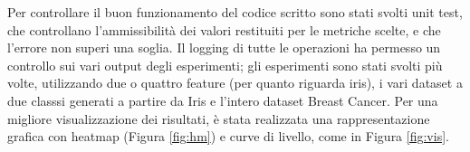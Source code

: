 \documentclass[oneside, openany]{book}
\begin{document}
	Per controllare il buon funzionamento del codice scritto sono stati svolti unit test, che controllano l'ammissibilità dei valori restituiti per le metriche scelte, e che l'errore non superi una soglia. Il logging di tutte le operazioni ha permesso un controllo sui vari output degli esperimenti; gli esperimenti sono stati svolti più volte, utilizzando due o quattro feature (per quanto riguarda iris), i vari dataset a due classsi generati a partire da Iris e l'intero dataset Breast Cancer.
	Per una migliore visualizzazione dei risultati, è stata realizzata una rappresentazione grafica con heatmap (Figura \ref{fig:hm}) e curve di livello, come in Figura \ref{fig:vis}. 
	\begin{figure}[h]
		\centering
		\quad 
		\\
		\quad 

\end{figure}
\end{document}
